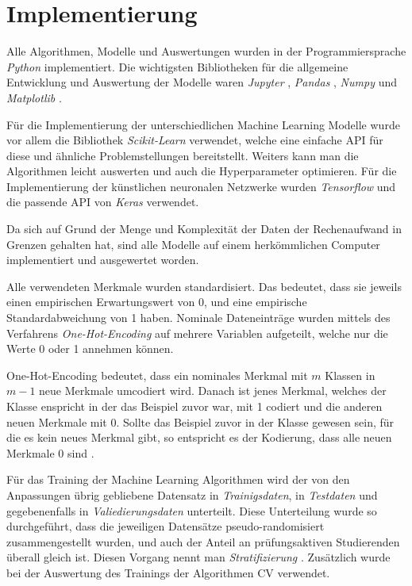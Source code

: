 

\section{Implementierung}
\label{sec:impl}

Alle Algorithmen, Modelle und Auswertungen wurden in der Programmiersprache \textit{Python} \cite{python} implementiert. Die wichtigsten
Bibliotheken f\"ur die allgemeine Entwicklung und Auswertung der Modelle waren
\textit{Jupyter} \cite{jupyter}, \textit{Pandas} \cite{pandas}, \textit{Numpy} \cite{numpy} und \textit{Matplotlib} \cite{plt}.

F\"ur die Implementierung der unterschiedlichen Machine Learning Modelle wurde vor allem die Bibliothek \textit{Scikit-Learn} \cite{sklearn_api} verwendet, welche eine einfache API f\"ur
diese und \"ahnliche Problemstellungen bereitstellt. Weiters kann man die Algorithmen leicht auswerten und auch die Hyperparameter optimieren.
F\"ur die Implementierung der k\"unstlichen neuronalen Netzwerke wurden \textit{Tensorflow} \cite{tensorflow} und die passende API von \textit{Keras} \cite{keras} verwendet.

Da sich auf Grund der Menge und Komplexit\"at der Daten der Rechenaufwand in Grenzen gehalten hat, sind alle Modelle auf einem
herk\"ommlichen Computer implementiert und ausgewertet worden.

Alle verwendeten Merkmale wurden standardisiert. Das bedeutet, dass sie jeweils einen empirischen Erwartungswert
von 0, und eine empirische Standardabweichung von 1 haben. Nominale Dateneintr\"age wurden mittels des Verfahrens \textit{One-Hot-Encoding} auf mehrere Variablen
aufgeteilt, welche nur die Werte 0 oder 1 annehmen k\"onnen.

One-Hot-Encoding bedeutet, dass ein nominales Merkmal mit $m$ Klassen in $m-1$ neue Merkmale umcodiert wird. Danach ist jenes Merkmal, welches
der Klasse enspricht in der das Beispiel zuvor war, mit 1 codiert und die anderen neuen Merkmale mit 0. Sollte das Beispiel zuvor in der Klasse gewesen sein, f\"ur die
es kein neues Merkmal gibt, so entspricht es der Kodierung, dass alle neuen Merkmale 0 sind \cite[Seite 67]{handson}.

F\"ur das Training der Machine Learning Algorithmen wird der von den Anpassungen \"ubrig gebliebene Datensatz
in \textit{Trainigsdaten}, in \textit{Testdaten} und gegebenenfalls in \textit{Valiedierungsdaten} unterteilt.
Diese Unterteilung wurde so durchgef\"uhrt, dass die jeweiligen Datens\"atze pseudo-randomisiert zusammengestellt wurden,
und auch der Anteil an pr\"ufungsaktiven Studierenden \"uberall gleich ist. Diesen Vorgang nennt man \textit{Stratifizierung} \cite[Seite 53]{handson}. Zus\"atzlich wurde bei der Auswertung des Trainings der
Algorithmen \gls{CV} verwendet.

